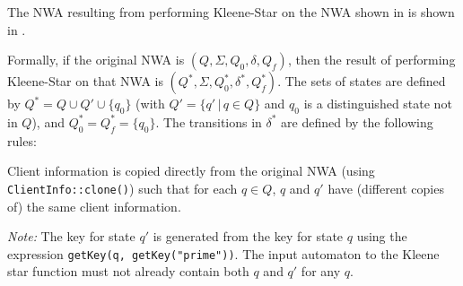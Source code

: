 The NWA resulting from performing Kleene-Star on the NWA shown in
 is shown in .

Formally, if the original NWA is $(Q, \Sigma, Q_0, \delta, Q_f)$,
then the result of performing Kleene-Star on that NWA is $(Q^*, \Sigma,
Q_0^*, \delta^*, Q_f^*)$. The sets of states are defined by $Q^* = Q \cup
Q' \cup \{q_0\}$ (with $Q' = \{q'\, |\, q \in Q\}$ and $q_0$ is a
distinguished state not in $Q$),
and  $Q_0^* = Q_f^* = \{q_0\}$.
The transitions in $\delta^*$ are defined by the following rules:



Client information is copied directly from the original NWA (using
\texttt{ClientInfo::clone()}) such that for each $q \in Q$, $q$
and $q'$ have (different copies of) the same client information.

\emph{Note:} The key for state $q'$ is generated from the key for state $q$
using the expression \texttt{getKey(q, getKey("prime"))}. The input automaton
to the Kleene star function must not already contain both $q$ and $q'$ for
any $q$.




